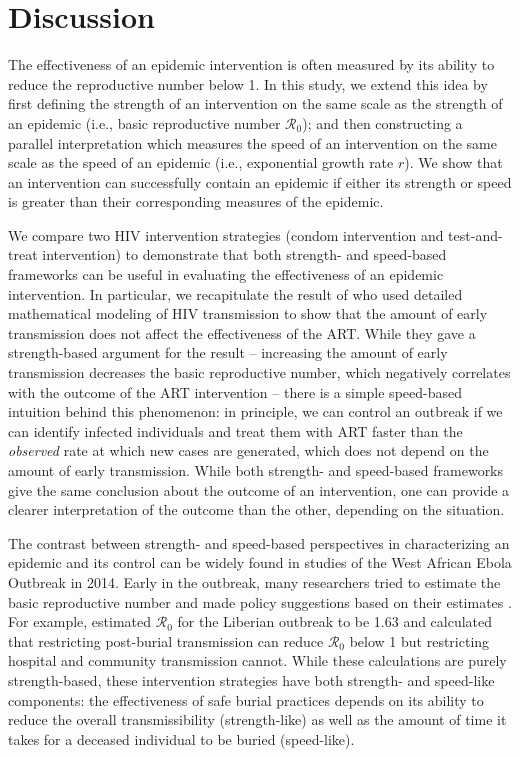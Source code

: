 \documentclass[12pt]{article}
\begin{document}
\section{Discussion}

The effectiveness of an epidemic intervention is often measured by its ability to reduce the reproductive number below 1.
In this study, we extend this idea by first defining the strength of an intervention on the same scale as the strength of an epidemic (i.e., basic reproductive number $\mathcal R_0$); and then constructing a parallel interpretation which measures the speed of an intervention on the same scale as the speed of an epidemic (i.e., exponential growth rate $r$).
We show that an intervention can successfully contain an epidemic if either its strength or speed is greater than their corresponding measures of the epidemic.

We compare two HIV intervention strategies (condom intervention and test-and-treat intervention) to demonstrate that both strength- and speed-based frameworks can be useful in evaluating the effectiveness of an epidemic intervention.
In particular, we recapitulate the result of \cite{eaton2014proportion} who used detailed mathematical modeling of HIV transmission to show that the amount of early transmission does not affect the effectiveness of the ART.
While they gave a strength-based argument for the result --  increasing the amount of early transmission decreases the basic reproductive number, which negatively correlates with the outcome of the ART intervention \citep{eaton2014proportion} -- there is a simple speed-based intuition behind this phenomenon: in principle, we can control an outbreak if we can identify infected individuals and treat them with ART faster than the \emph{observed} rate at which new cases are generated, which does not depend on the amount of early transmission.
While both strength- and speed-based frameworks give the same conclusion about the outcome of an intervention, one can provide a clearer interpretation of the outcome than the other, depending on the situation.

The contrast between strength- and speed-based perspectives in characterizing an epidemic and its control can be widely found in studies of the West African Ebola Outbreak in 2014.
Early in the outbreak, many researchers tried to estimate the basic reproductive number and made policy suggestions based on their estimates \citep{althaus2014estimating, fisman2014early, gomes2014assessing, pandey2014strategies, shaman2014inference, towers2014temporal, who2014ebola}.
For example, \cite{pandey2014strategies} estimated $\mathcal R_0$ for the Liberian outbreak to be 1.63 and calculated that restricting post-burial transmission can reduce $\mathcal R_0$ below 1 but restricting hospital and community transmission cannot.
While these calculations are purely strength-based, these intervention strategies have both strength- and speed-like components: the effectiveness of safe burial practices depends on its ability to reduce the overall transmissibility (strength-like) as well as the amount of time it takes for a deceased individual to be buried (speed-like).
\end{document}
